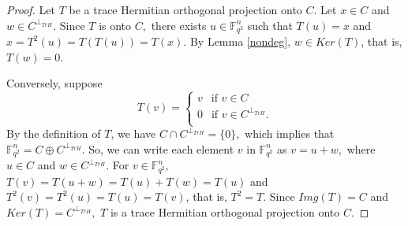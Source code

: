 \documentclass[sn-mathphys-num]{sn-jnl}%
\theoremstyle{thmstyleone}%
\theoremstyle{thmstyletwo}%
\theoremstyle{thmstylethree}%
\begin{document}
\begin{proof}
	Let $T$ be a trace Hermitian orthogonal projection onto $C$. Let $x\in C$ and $w\in C^{\perp_{TrH}}.$ Since $T$ is onto $C,$ there exists $u\in \mathbb{F}_{q^2}^n$ such that $T(u)=x$ and $x=T^2(u)=T(T(u))=T(x).$ By Lemma \ref{nondeg},  $w\in Ker(T)$, that is, $T(w)=0.$
	
	Conversely, suppose 
	\begin{equation*}
		T(v)=\begin{cases}
			v\ \ \text{ if } v\in C \\
			0 \ \ \text{ if }v\in C^{\perp_{TrH}}.\\
		\end{cases}
	\end{equation*}
	By the definition of $T$, we have $C\cap C^{\perp_{TrH}}=\{0\},$ which implies that $\mathbb{F}_{q^2}^n=C\oplus C^{\perp_{TrH}}.$ So, we can write each element $v$ in $\mathbb{F}_{q^2}^n$ as $v=u+w,$ where $u\in C$ and $w\in C^{\perp_{TrH}}.$  For $v\in\mathbb{F}_{q^2}^n ,$ $T(v)=T(u+w)=T(u)+T(w)=T(u)$ and $T^2(v)=T^2(u)=T(u)=T(v)$, that is, $T^2=T.$ Since $Img(T)=C$ and $Ker(T)=C^{\perp_{TrH}},$ $T$ is a trace Hermitian orthogonal projection onto $C.$
\end{proof}
\end{document}
